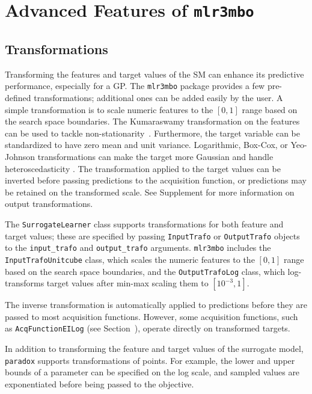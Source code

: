 \documentclass[12pt,letterpaper]{article}
\begin{document}
\section{Advanced Features of \texttt{mlr3mbo}}

\label{sec:advanced-features}

\subsection*{Transformations}

\label{sec:transformations}

Transforming the features and target values of the SM can enhance its predictive performance, especially for a GP.
The \texttt{mlr3mbo} package provides a few pre-defined transformations; additional ones can be added easily by the user.
A simple transformation is to scale numeric features to the \([0, 1]\) range based on the search space boundaries.
The Kumaraswamy transformation on the features can be used to tackle non-stationarity~\cite{cowen-rivers2022}.
Furthermore, the target variable can be standardized to have zero mean and unit variance.
Logarithmic, Box-Cox, or Yeo-Johnson transformations can make the target more Gaussian and handle heteroscedasticity \cite{snelson2003, cowen-rivers2022}.
The transformation applied to the target values can be inverted before passing predictions to the acquisition function, or predictions may be retained on the transformed scale.
See Supplement  for more information on output transformations.

The \texttt{SurrogateLearner} class supports transformations for both feature and target values; these are specified by passing \texttt{InputTrafo} or \texttt{OutputTrafo} objects to the \texttt{input\_trafo} and \texttt{output\_trafo} arguments.
\texttt{mlr3mbo} includes the \texttt{InputTrafoUnitcube} class, which scales the numeric features to the \([0, 1]\) range based on the search space boundaries, and the \texttt{OutputTrafoLog} class, which log-transforms target values after min-max scaling them to $[10^{-3}, 1]$.

The inverse transformation is automatically applied to predictions before they are passed to most acquisition functions. 
However, some acquisition functions, such as \texttt{AcqFunctionEILog} (see Section~), operate directly on transformed targets.

In addition to transforming the feature and target values of the surrogate model, \texttt{paradox} supports transformations of points.
For example, the lower and upper bounds of a parameter can be specified on the log scale, and sampled values are exponentiated before being passed to the objective.
\end{document}
